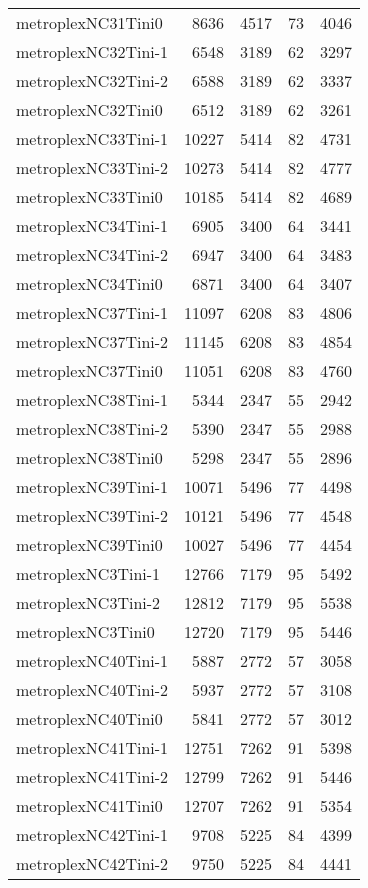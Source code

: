 \documentclass[../../../thesis.tex]{subfiles}
\begin{document}
\begin{longtable}{lrrrr}
metroplexNC31Tini0 & 8636 & 4517 & 73 & 4046 \\
metroplexNC32Tini-1 & 6548 & 3189 & 62 & 3297 \\
metroplexNC32Tini-2 & 6588 & 3189 & 62 & 3337 \\
metroplexNC32Tini0 & 6512 & 3189 & 62 & 3261 \\
metroplexNC33Tini-1 & 10227 & 5414 & 82 & 4731 \\
metroplexNC33Tini-2 & 10273 & 5414 & 82 & 4777 \\
metroplexNC33Tini0 & 10185 & 5414 & 82 & 4689 \\
metroplexNC34Tini-1 & 6905 & 3400 & 64 & 3441 \\
metroplexNC34Tini-2 & 6947 & 3400 & 64 & 3483 \\
metroplexNC34Tini0 & 6871 & 3400 & 64 & 3407 \\
metroplexNC37Tini-1 & 11097 & 6208 & 83 & 4806 \\
metroplexNC37Tini-2 & 11145 & 6208 & 83 & 4854 \\
metroplexNC37Tini0 & 11051 & 6208 & 83 & 4760 \\
metroplexNC38Tini-1 & 5344 & 2347 & 55 & 2942 \\
metroplexNC38Tini-2 & 5390 & 2347 & 55 & 2988 \\
metroplexNC38Tini0 & 5298 & 2347 & 55 & 2896 \\
metroplexNC39Tini-1 & 10071 & 5496 & 77 & 4498 \\
metroplexNC39Tini-2 & 10121 & 5496 & 77 & 4548 \\
metroplexNC39Tini0 & 10027 & 5496 & 77 & 4454 \\
metroplexNC3Tini-1 & 12766 & 7179 & 95 & 5492 \\
metroplexNC3Tini-2 & 12812 & 7179 & 95 & 5538 \\
metroplexNC3Tini0 & 12720 & 7179 & 95 & 5446 \\
metroplexNC40Tini-1 & 5887 & 2772 & 57 & 3058 \\
metroplexNC40Tini-2 & 5937 & 2772 & 57 & 3108 \\
metroplexNC40Tini0 & 5841 & 2772 & 57 & 3012 \\
metroplexNC41Tini-1 & 12751 & 7262 & 91 & 5398 \\
metroplexNC41Tini-2 & 12799 & 7262 & 91 & 5446 \\
metroplexNC41Tini0 & 12707 & 7262 & 91 & 5354 \\
metroplexNC42Tini-1 & 9708 & 5225 & 84 & 4399 \\
metroplexNC42Tini-2 & 9750 & 5225 & 84 & 4441 \\

\end{longtable}
\end{document}
